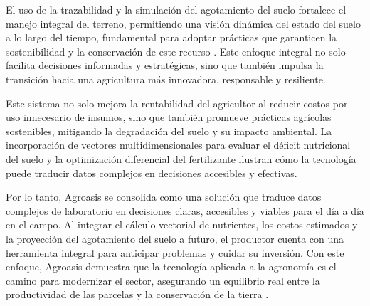 \documentclass[12pt]{article}
\begin{document}
El uso de la trazabilidad y la simulación del agotamiento del suelo fortalece el manejo integral del terreno, permitiendo una visión dinámica del estado del suelo a lo largo del tiempo, fundamental para adoptar prácticas que garanticen la sostenibilidad y la conservación de este recurso \citep{obalum_2017}. Este enfoque integral no solo facilita decisiones informadas y estratégicas, sino que también impulsa la transición hacia una agricultura más innovadora, responsable y resiliente.

Este sistema no solo mejora la rentabilidad del agricultor al reducir costos por uso innecesario de insumos, sino que también promueve prácticas agrícolas sostenibles, mitigando la degradación del suelo y su impacto ambiental. La incorporación de vectores multidimensionales para evaluar el déficit nutricional del suelo y la optimización diferencial del fertilizante ilustran cómo la tecnología puede traducir datos complejos en decisiones accesibles y efectivas.

Por lo tanto, Agroasis se consolida como una solución que traduce datos complejos de laboratorio en decisiones claras, accesibles y viables para el día a día en el campo. Al integrar el cálculo vectorial de nutrientes, los costos estimados y la proyección del agotamiento del suelo a futuro, el productor cuenta con una herramienta integral para anticipar problemas y cuidar su inversión. Con este enfoque, Agroasis demuestra que la tecnología aplicada a la agronomía es el camino para modernizar el sector, asegurando un equilibrio real entre la productividad de las parcelas y la conservación de la tierra \citep{gebbers_2010}.

\newpage


\end{document}

